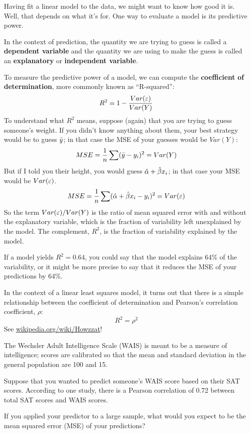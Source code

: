 \documentclass[12pt]{book}
\begin{document}
Having fit a linear model to the data, we might want to know how good
it is.  Well, that depends on what it's for.  One way to evaluate a
model is its predictive power.

In the context of prediction, the quantity we are trying to guess is
called a {\bf dependent variable} and the quantity we are using to
make the guess is called an {\bf explanatory} or {\bf independent
  variable}.

To measure the predictive power of a model, we can compute the {\bf
  coefficient of determination}, more commonly known as ``R-squared'':
%
\[ R^2 = 1 - \frac{Var(\varepsilon)}{Var(Y)}\]
%
To understand what $R^2$ means, suppose (again) that you are trying
to guess someone's weight.  If you didn't know anything about them,
your best strategy would be to guess $\bar{y}$; in
that case the MSE of your guesses would be $Var(Y)$:
%
\[ MSE = \frac{1}{n} \sum (\bar{y} - y_i)^2 = Var(Y) \]
%
But if I told you their height, you would guess $\hat{\alpha} +
\hat{\beta} x_i$; in that case your MSE would be $Var(\varepsilon)$.
%
\[ MSE = 
\frac{1}{n} \sum (\hat{\alpha} + \hat{\beta} x_i - y_i)^2 =
Var(\varepsilon) \]
%
So the term $Var(\varepsilon)/Var(Y)$ is the ratio of mean squared error with
and without the explanatory variable, which is the fraction of
variability left unexplained by the model.  The complement, $R^2$,
is the fraction of variability explained by the model.

If a model yields $R^2 = 0.64$, you could say that the model explains
64\% of the variability, or it might be more precise to say that it
reduces the MSE of your predictions by 64\%.

In the context of a linear least squares model, it turns out that
there is a simple relationship between the coefficient of
determination and Pearson's correlation coefficient, $\rho$:
%
\[ R^2 = \rho^2 \]
%
See \url{wikipedia.org/wiki/Howzzat}!

\begin{ex}

The Wechsler Adult Intelligence Scale (WAIS) is meant to be a measure
of intelligence; scores are calibrated so that the mean and standard
deviation in the general population are 100 and 15.

Suppose that you wanted to predict someone's WAIS score based on their
SAT scores.  According to one study, there is a Pearson correlation of
0.72 between total SAT scores and WAIS scores.

If you applied your predictor to a large sample, what would you expect to
be the mean squared error (MSE) of your predictions?

\end{ex}
\end{document}
